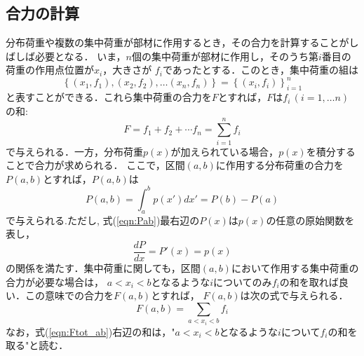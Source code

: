 \documentclass[11pt,a4j]{mybook2}
\begin{document}
\subsection{合力の計算}
分布荷重や複数の集中荷重が部材に作用するとき，その合力を計算することがしばしば必要となる．
いま，$n$個の集中荷重が部材に作用し，そのうち第$i$番目の荷重の作用点位置が$x_i$，大きさが
$f_i$であったとする．このとき，集中荷重の組は
\[
	\left\{ 
	(x_1,f_1),(x_2,f_2),\dots (x_n,f_n)
	\right\}
	=
	\left\{
		(x_i,f_i)
	\right\}_{i=1}^n
\]
と表すことができる．これら集中荷重の合力を$F$とすれば，$F$は$f_i\, (i=1,\dots n)$の和:
\begin{equation}
	F=f_1+f_2+\cdots f_n=\sum_{i=1}^n f_i
	\label{eq:Ftot}
\end{equation}
で与えられる．一方，分布荷重$p(x)$が加えられている場合，$p(x)$を積分することで合力が求められる．
ここで，区間$(a,b)$に作用する分布荷重の合力を$P(a,b)$とすれば，$P(a,b)$は
\begin{equation}
	P(a,b)=\int_{a}^{b}p(x')dx'=P(b)-P(a)
	\label{eqn:Pab}
\end{equation}
で与えられる.ただし, 式(\ref{eqn:Pab})最右辺の$P(x)$は$p(x)$の任意の原始関数を表し，
\begin{equation}
	\frac{dP}{dx}=P'(x)=p(x)
	\label{eqn:dPdx}
\end{equation}
の関係を満たす．集中荷重に関しても，区間$(a,b)$において作用する集中荷重の合力が必要な場合は，
$a< x_i < b$となるような$i$についてのみ$f_i$の和を取れば良い．この意味での合力を$F(a,b)$とすれば，
$F(a,b)$は次の式で与えられる．
\begin{equation}
	F(a,b)=\sum_{　a < x_i <b } f_i
	\label{eqn:Ftot_ab}
\end{equation}
なお，式(\ref{eqn:Ftot_ab})右辺の和は，"$a<x_i<b$となるような$i$について$f_i$の和を取る"と読む．
\end{document}
